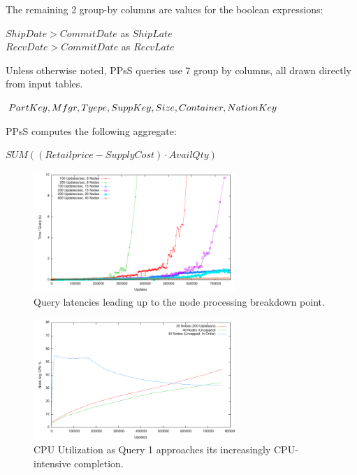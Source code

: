 \noindent The remaining 2 group-by columns are values for the boolean expressions:

{\noindent $ShipDate > CommitDate$ as $ShipLate$\\
$RecvDate > CommitDate$ as $RecvLate$}

Unless otherwise noted, PPsS queries use 7 group by columns, all drawn directly from input tables.  

{\noindent $PartKey, Mfgr, Tyepe, SuppKey, \\
Size, Container, NationKey$}

PPsS computes the following aggregate:

{\noindent$SUM((Retailprice - SupplyCost) \cdot AvailQty)$}


\begin{figure}
\begin{center}
\includegraphics[width=3.0in]{images/expandingbreakdown.pdf}
\caption{Query latencies leading up to the node processing breakdown point.}
\label{fig:expandingbreakdown}
\end{center}
\end{figure}
\begin{figure}
\begin{center}
\includegraphics[width=3.0in]{images/100mbUpdatesVsCPUCompletion.pdf}
\caption{CPU Utilization as Query 1 approaches its increasingly CPU-intensive completion.}
\label{fig:20nodes100mbUpdatesVsCPUCompletion}
\end{center}
\end{figure}
